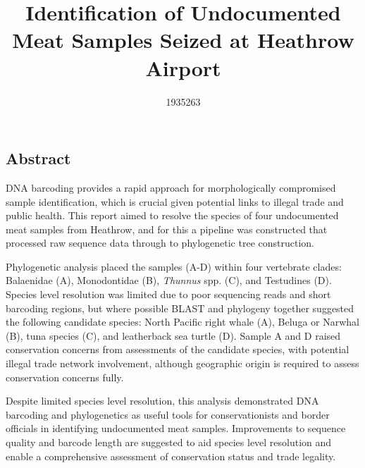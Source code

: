 \documentclass[11pt]{article}
\title{\LARGE\textbf{Identification of Undocumented Meat Samples Seized at Heathrow Airport}}
\author{1935263}
\date{}
\begin{document}
{\sffamily
\maketitle
\thispagestyle{empty}
\begin{tcolorbox}[colframe=BlueGreen, colback=white, boxrule=0.5pt]\section*{Abstract} %
\small\color{black!80}
DNA barcoding provides a rapid approach for morphologically compromised sample identification, which is crucial given potential links to illegal trade and public health. This report aimed to resolve the species of four undocumented meat samples from Heathrow, and for this a  pipeline was constructed that processed raw sequence data through to phylogenetic tree construction.
\par Phylogenetic analysis placed the samples (A-D) within four vertebrate clades: Balaenidae (A), Monodontidae (B), \textit{Thunnus} spp. (C), and Testudines (D). Species level resolution was limited due to poor sequencing reads and short barcoding regions, but where possible BLAST and phylogeny together suggested the following candidate species: North Pacific right whale (A), Beluga or Narwhal (B), tuna species (C), and leatherback sea turtle (D). Sample A and D raised conservation concerns from assessments of the candidate species, with potential illegal trade network involvement, although geographic origin is required to assess conservation concerns fully. 
\par Despite limited species level resolution, this analysis demonstrated DNA barcoding and phylogenetics as useful tools for conservationists and border officials in identifying undocumented meat samples. Improvements to sequence quality and barcode length are suggested to aid species level resolution and enable a comprehensive assessment of conservation status and trade legality.
\end{tcolorbox}
}
\end{document}
